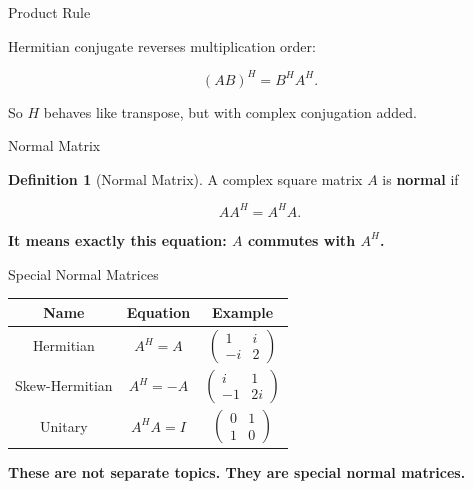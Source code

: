 \documentclass[10pt]{beamer}
\theoremstyle{definition}
\newtheorem{defi}{Definition}[section]
\newcommand{\x}[1]{\alert{\textbf{#1}}}
\begin{document}
\begin{frame}{Product Rule}

Hermitian conjugate reverses multiplication order:

$$
\boxed{(AB)^H=B^HA^H.}
$$

\vfill

So $H$ behaves like transpose, but with complex conjugation added.

\vfill

\begin{center}
\end{center}

\end{frame}

\begin{frame}{Normal Matrix}

\begin{defi}[Normal Matrix]
A complex square matrix $A$ is \x{normal} if

$$
AA^H=A^HA.
$$
\end{defi}

\vfill

\begin{center}
\x{It means exactly this equation: $A$ commutes with $A^H$.}
\end{center}

\end{frame}

\begin{frame}[shrink=8]{Special Normal Matrices}

\begin{center}
\renewcommand{\arraystretch}{1.25}
\begin{tabular}{c|c|c}
\textbf{Name} & \textbf{Equation} & \textbf{Example}\\
\hline
Hermitian & $A^H=A$ &
$\begin{pmatrix}1&i\\-i&2\end{pmatrix}$\\[0.7em]
Skew-Hermitian & $A^H=-A$ &
$\begin{pmatrix}i&1\\-1&2i\end{pmatrix}$\\[0.7em]
Unitary & $A^HA=I$ &
$\begin{pmatrix}0&1\\1&0\end{pmatrix}$
\end{tabular}
\end{center}

\vfill

\begin{center}
\x{These are not separate topics. They are special normal matrices.}
\end{center}

\end{frame}
\end{document}
